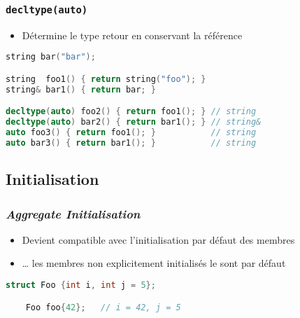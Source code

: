 \documentclass[C++.tex]{subfiles}
\begin{document}
\begin{frame}[fragile]
	\frametitle{\lstinline|decltype(auto)|}
	\begin{itemize}
		\item Détermine le type retour en conservant la référence
	\end{itemize}

	\begin{lstlisting}[language=C++]
string bar("bar");

string  foo1() { return string("foo"); }
string& bar1() { return bar; }

decltype(auto) foo2() { return foo1(); } // string
decltype(auto) bar2() { return bar1(); } // string&
auto foo3() { return foo1(); }           // string
auto bar3() { return bar1(); }           // string\end{lstlisting}
\end{frame}

\subsection*{Initialisation}
\begin{frame}[fragile]
	\frametitle{\textit{Aggregate Initialisation}}
	\begin{itemize}
		\item Devient compatible avec l'initialisation par défaut des membres
		\item \ldots{} les membres non explicitement initialisés le sont par défaut
	\end{itemize}

	\begin{lstlisting}[language=C++]
	struct Foo {int i, int j = 5};

	Foo foo{42};   // i = 42, j = 5\end{lstlisting}
\end{frame}
\end{document}
